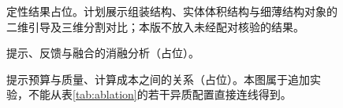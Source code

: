 \begin{figure}[t]
  \centering
  \caption{定性结果占位。计划展示组装结构、实体体积结构与细薄结构对象的二维引导及三维分割对比；本版不放入未经配对核验的结果。}
  \label{fig:qualitative}
\end{figure}
\begin{figure}[t]
  \centering
  \begin{minipage}[t]{0.48\textwidth}
    \centering
    \caption{结构类别对结果的影响（占位）。}
    \label{fig:group-bars}
  \end{minipage}\hfill
  \begin{minipage}[t]{0.48\textwidth}
    \centering
    \caption{提示、反馈与融合的消融分析（占位）。}
    \label{fig:ablation-bars}
  \end{minipage}
\end{figure}
\begin{figure}[t]
  \centering
  \caption{提示预算与质量、计算成本之间的关系（占位）。本图属于追加实验，不能从表\ref{tab:ablation}的若干异质配置直接连线得到。}
  \label{fig:budget-lines}
\end{figure}
